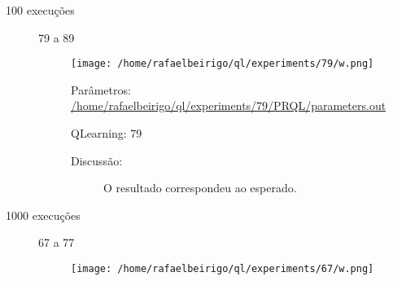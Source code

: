 \documentclass[11pt]{article}
\begin{document}
\begin{description}
\begin{description}
\begin{description}
\begin{description}
\begin{description}
\end{description}
\end{description}
\end{description}
\begin{description}

\item[100 execuções]\label{sec-11.1.2.1.3.2}


\begin{description}

\item[79 a 89]\label{sec-11.1.2.1.3.2.1}


\centerline{\texttt{[image: /home/rafaelbeirigo/ql/experiments/79/w.png]}}


\begin{description}

\item[Parâmetros: \href{file:///home/rafaelbeirigo/ql/experiments/79/PRQL/parameters.out}{/home/rafaelbeirigo/ql/experiments/79/PRQL/parameters.out}]\label{sec-11.1.2.1.3.2.1.1}


\end{description}
\begin{description}

\item[QLearning: 79]\label{sec-11.1.2.1.3.2.1.2}



\end{description}
\begin{description}

\item[Discussão:]\label{sec-11.1.2.1.3.2.1.3}


O resultado correspondeu ao esperado.

\end{description}
\end{description}
\end{description}
\begin{description}

\item[1000 execuções]\label{sec-11.1.2.1.3.3}


\begin{description}

\item[67 a 77]\label{sec-11.1.2.1.3.3.1}


\centerline{\texttt{[image: /home/rafaelbeirigo/ql/experiments/67/w.png]}}


\begin{description}


\end{description}
\end{description}
\end{description}
\end{description}
\end{description}
\end{document}
